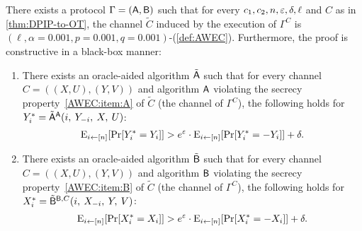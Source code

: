 \begin{lemma}\label{lemma:DPIP-to-AWEC}
        There exists a \ppt protocol $\Gamma=(\mathsf{A},\mathsf{B})$ such that for every $c_1,c_2,n,\varepsilon,\delta,\ell$ and $C$ as in \cref{thm:DPIP-to-OT},
        the channel $\tilde{C}$ induced by the execution of $\Gamma^C$ is $(\ell, \alpha=0.001, p=0.001, q=0.001)$-\AWEC (\cref{def:AWEC}).
    Furthermore, the proof is constructive in a black-box manner:
	\begin{enumerate}
		\item There exists an oracle-aided \ppt algorithm ${\tilde{\mathsf{A}}}$ such that for every channel $C = ((X,U),(Y,V))$ and algorithm $\mathsf{A}$ violating the \AWEC secrecy property~\ref{AWEC:item:A} of $\tilde{C}$ (the channel of $\Gamma^C$), the following holds for $Y^*_i = {\tilde{\mathsf{A}}}^{\mathsf{A}}(i,\: Y_{-i}, \: X, \: U)$:\label{item:privacy-of-Y}
		\begin{align*}
			\eex{i \la [n]}{\pr{Y^*_i = Y_i }} > e^{\eps} \cdot \eex{i \la [n]}{\pr{Y^*_i = -Y_i }} + \delta.
		\end{align*}
		
		
		
		
		\item There exists an oracle-aided \ppt algorithm ${\tilde{\mathsf{B}}}$ such that for every channel $C = ((X,U),(Y,V))$ and algorithm $\mathsf{B}$ violating the \AWEC secrecy property~\ref{AWEC:item:B} of $\tilde{C}$ (the channel of $\Gamma^C$),  the following holds for $X^*_i = {\tilde{\mathsf{B}}}^{\mathsf{B}, C}(i,\: X_{-i}, \: Y, \: V)$:\label{item:privacy-of-X}
		\begin{align*}
			\eex{i \la [n]}{\pr{X^*_i = X_i }} > e^{\eps} \cdot \eex{i \la [n]}{\pr{X^*_i = -X_i }} + \delta.
		\end{align*} 
	\end{enumerate}
\end{lemma}


